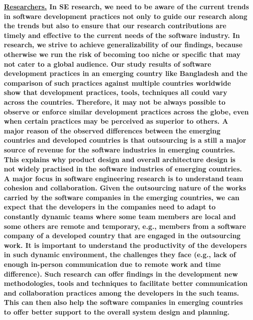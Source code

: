 % 

\bf{\ul{Researchers.}} In SE research, we need to be aware of the current trends in software development practices not only 
to guide our research along the trends but also to ensure that our research contributions are timely and effective to the current 
needs of the software industry. In research, we strive to achieve generalizability of our findings, because otherwise we 
run the risk of becoming too niche or specific that may not cater to a global audience. Our study results of 
software development practices in an emerging country like Bangladesh and the comparison of 
such practices against multiple countries worldwide show that development practices, tools, techniques all could 
vary across the countries. Therefore, it may not be always possible to observe or enforce 
similar development practices across the globe, even when certain practices may be perceived as superior to others. 
A major reason of the observed differences between the emerging 
countries and developed countries is that outsourcing is a still a major source of revenue 
for the software industries in emerging countries. This explains why product design and overall architecture design 
is not widely practised in the software industries of emerging countries. A major 
focus in software engineering research is to understand team cohesion and collaboration. Given 
the outsourcing nature of the works carried by the software companies in the emerging countries, 
we can expect that the developers in the companies need to adapt to constantly dynamic teams where some 
team members are local and some others are remote and temporary, e.g., members from a software company 
of a developed country that are engaged in the outsourcing work. It is important to understand 
the productivity of the developers in such dynamic environment, the 
challenges they face (e.g., lack of enough in-person communication due to remote work and time difference).
Such research can offer findings in the development new methodologies, tools and techniques to facilitate 
better communication and collaboration practices among the developers in the such teams. This can 
then also help the software companies in emerging countries to offer better support to the overall system 
design and planning. 

